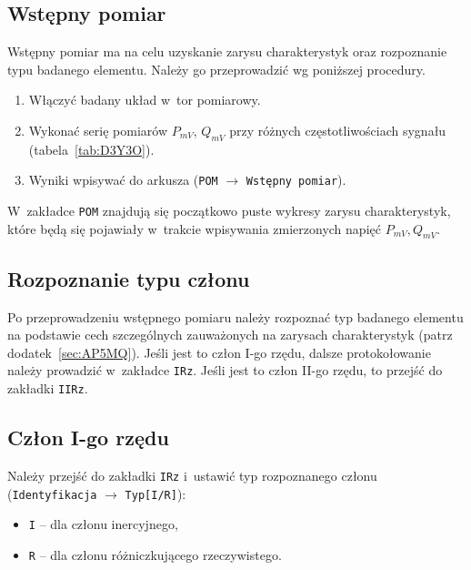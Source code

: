 \documentclass[paper=a4,DIV=12]{lpas}
\begin{document}
\subsection{Wstępny pomiar}
\label{sec:NU1XH}

Wstępny pomiar ma na celu uzyskanie zarysu charakterystyk oraz rozpoznanie typu
badanego elementu. Należy go przeprowadzić wg poniższej procedury.
\begin{enumerate}
  \item Włączyć badany układ w~tor pomiarowy.
  \item Wykonać serię pomiarów $P_{mV}$, $Q_{mV}$ przy różnych
    częstotliwościach sygnału (tabela~\ref{tab:D3Y3O}).
  \item Wyniki wpisywać do arkusza (\texttt{POM} $\rightarrow$ \texttt{Wstępny pomiar}).
\end{enumerate}
W~zakładce \texttt{POM} znajdują się początkowo puste wykresy zarysu
charakterystyk, które będą się pojawiały w~trakcie wpisywania zmierzonych
napięć $P_{mV}, Q_{mV}$.

\subsection{Rozpoznanie typu członu}
\label{sec:NVX7M}

Po przeprowadzeniu wstępnego pomiaru należy rozpoznać typ badanego elementu na
podstawie cech szczególnych zauważonych na zarysach charakterystyk
(patrz dodatek~\ref{sec:AP5MQ}). Jeśli jest to człon I-go rzędu, dalsze
protokołowanie należy prowadzić w~zakładce \texttt{IRz}. Jeśli jest to człon
II-go rzędu, to przejść do zakładki \texttt{IIRz}.

\subsection{Człon I-go rzędu}
\label{sec:3Q2SV}

Należy przejść do zakładki \texttt{IRz} i~ustawić typ rozpoznanego członu
(\texttt{Identyfikacja} $\rightarrow$ \texttt{Typ[I/R]}):
\begin{itemize}
  \item \texttt{I} -- dla członu inercyjnego,
  \item \texttt{R} -- dla członu różniczkującego rzeczywistego.
\end{itemize}
\end{document}
